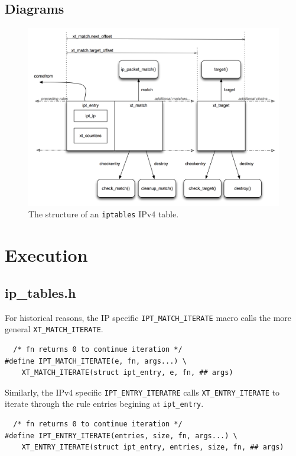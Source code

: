 \documentclass[a4paper,10pt]{article}
\newcommand{\code}[1]{\texttt{#1}}
\begin{document}
\subsection{Diagrams}

\begin{figure}[H]
\centering
\includegraphics[totalheight=0.45\textheight]{images/table1.png}
\caption{The structure of an \code{iptables} IPv4 table.}\label{fig:table1}
\end{figure}

\section{Execution}

\subsection{ip\_tables.h}

For historical reasons, the IP specific \code{IPT\_MATCH\_ITERATE}
macro calls the more general \code{XT\_MATCH\_ITERATE}. 

\begin{lstlisting}
  /* fn returns 0 to continue iteration */
#define IPT_MATCH_ITERATE(e, fn, args...) \
	XT_MATCH_ITERATE(struct ipt_entry, e, fn, ## args)
\end{lstlisting}

Similarly, the IPv4 specific \code{IPT\_ENTRY\_ITERATRE} calls
\code{XT\_ENTRY\_ITERATE} to iterate through the rule entries begining
at \code{ipt\_entry}.

\begin{lstlisting}
  /* fn returns 0 to continue iteration */
#define IPT_ENTRY_ITERATE(entries, size, fn, args...) \
	XT_ENTRY_ITERATE(struct ipt_entry, entries, size, fn, ## args)
\end{lstlisting}
\end{document}

